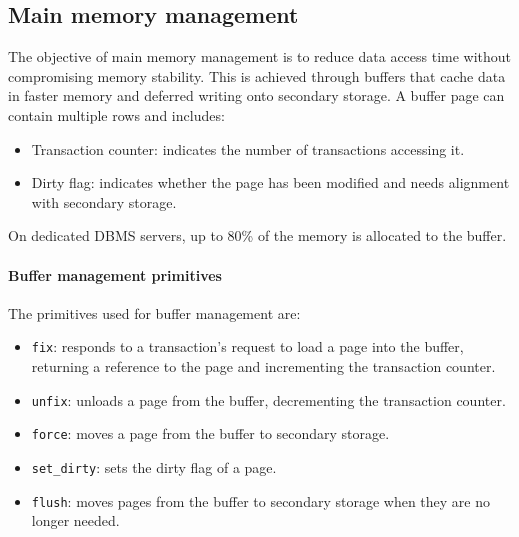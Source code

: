 \subsection{Main memory management}
The objective of main memory management is to reduce data access time without compromising memory stability. 
This is achieved through buffers that cache data in faster memory and deferred writing onto secondary storage.
A buffer page can contain multiple rows and includes:
\begin{itemize}
    \item Transaction counter: indicates the number of transactions accessing it.
    \item Dirty flag: indicates whether the page has been modified and needs alignment with secondary storage.
\end{itemize}
On dedicated DBMS servers, up to 80\% of the memory is allocated to the buffer.

\paragraph*{Buffer management primitives}
The primitives used for buffer management are: 
\begin{itemize}
    \item \texttt{fix}: responds to a transaction's request to load a page into the buffer, returning a reference to the page and incrementing the transaction counter.
    \item \texttt{unfix}: unloads a page from the buffer, decrementing the transaction counter.
    \item \texttt{force}: moves a page from the buffer to secondary storage.
    \item \texttt{set\_dirty}: sets the dirty flag of a page.
    \item \texttt{flush}: moves pages from the buffer to secondary storage when they are no longer needed.
\end{itemize}

